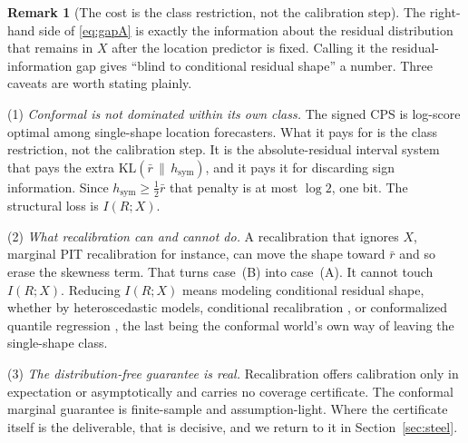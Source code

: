 \documentclass[11pt]{article}
\theoremstyle{definition}
\newtheorem{remark}{Remark}
\newcommand{\KL}{\mathrm{KL}}
\begin{document}
\begin{remark}[The cost is the class restriction, not the calibration step]
The right-hand side of \eqref{eq:gapA} is exactly the information about the residual
distribution that remains in $X$ after the location predictor is fixed. Calling it the
residual-information gap gives ``blind to conditional residual shape'' a number. Three
caveats are worth stating plainly.

(1) \emph{Conformal is not dominated within its own class.} The signed CPS is log-score
optimal among single-shape location forecasters. What it pays for is the class restriction,
not the calibration step. It is the absolute-residual interval system that pays the extra
$\KL(\bar r\,\|\,h_{\mathrm{sym}})$, and it pays it for discarding sign information. Since
$h_{\mathrm{sym}}\ge\tfrac12\bar r$ that penalty is at most $\log 2$, one bit. The
structural loss is $I(R;X)$.

(2) \emph{What recalibration can and cannot do.} A recalibration that ignores $X$, marginal
PIT recalibration for instance, can move the shape toward $\bar r$ and so erase the skewness
term. That turns case~(B) into case~(A). It cannot touch $I(R;X)$. Reducing $I(R;X)$ means
modeling conditional residual shape, whether by heteroscedastic models, conditional
recalibration \citep{kuleshov2018accurate}, or conformalized quantile regression
\citep{romano2019conformalized}, the last being the conformal world's own way of leaving the
single-shape class.

(3) \emph{The distribution-free guarantee is real.} Recalibration offers calibration only in
expectation or asymptotically and carries no coverage certificate. The conformal marginal
guarantee is finite-sample and assumption-light. Where the certificate itself is the
deliverable, that is decisive, and we return to it in Section~\ref{sec:steel}.
\end{remark}
\end{document}
